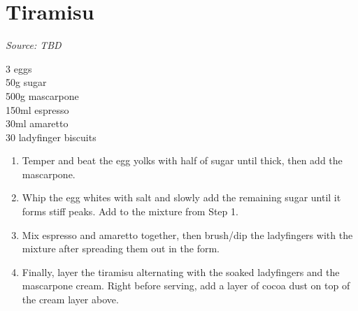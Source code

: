 \documentclass{report}
\begin{document}
\section{Tiramisu}
\textit{Source: TBD}\\
\begin{minipage}[t]{0.21\textwidth} \vspace{0pt} 
3 eggs\\
50g sugar\\
500g mascarpone\\
150ml espresso\\
30ml amaretto\\
30 ladyfinger biscuits
\end{minipage}
\hfill
\begin{minipage}[t]{0.78\textwidth} \vspace{0pt}
	\begin{enumerate}
		\item Temper and beat the egg yolks with half of sugar until thick, then add the mascarpone.
		\item Whip the egg whites with salt and slowly add the remaining sugar until it forms stiff peaks. Add to the mixture from Step 1.
		\item Mix espresso and amaretto together, then brush/dip the ladyfingers with the mixture after spreading them out in the form.
		\item Finally, layer the tiramisu alternating with the soaked ladyfingers and the mascarpone cream. Right before serving, add a layer of cocoa dust on top of the cream layer above.
	\end{enumerate}	
\end{minipage}
\end{document}
